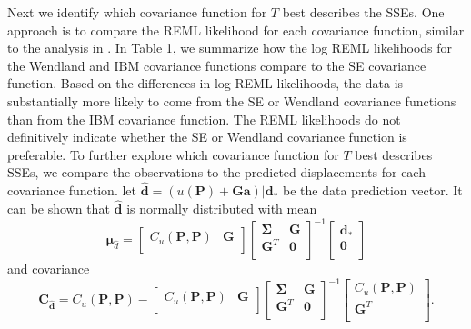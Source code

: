 \documentclass[10pt,letter]{article}
\begin{document}
Next we identify which covariance function for $T$ best describes the SSEs. One approach is to compare the REML likelihood for each covariance function, similar to the analysis in \citet{Langbein2004}. In Table 1, we summarize how the log REML likelihoods for the Wendland and IBM covariance functions compare to the SE covariance function.  Based on the differences in log REML likelihoods, the data is substantially more likely to come from the SE or Wendland covariance functions than from the IBM covariance function. The REML likelihoods do not definitively indicate whether the SE or Wendland covariance function is preferable. To further explore which covariance function for $T$ best describes SSEs, we compare the observations to the predicted displacements for each covariance function. let $\hat{\bm{d}} = \left(u(\bm{P}) + \bm{G}\bm{a}\right)|\bm{d}_*$ be the data prediction vector. It can be shown that $\hat{\bm{d}}$ is normally distributed with mean 
\begin{equation}\label{eq:DataPredMean}
\bm{\mu}_{\hat{d}} = \left[\begin{array}{cc}
                           C_u(\bm{P},\bm{P}) & \bm{G} \\
                           \end{array}\right]
                     \left[\begin{array}{cc}
                           \bm{\Sigma} & \bm{G} \\
                           \bm{G}^T  & \bm{0} \\
                           \end{array}\right]^{-1}
                     \left[\begin{array}{c}
                           \bm{d}_* \\
                           \bm{0} \\
                           \end{array}\right]
\end{equation}  
and covariance
\begin{equation}\label{eq:DataPredCov}
\bm{C}_{\hat{\bm{d}}} = C_u(\bm{P},\bm{P}) - 
                        \left[\begin{array}{cc}
                              C_u(\bm{P},\bm{P}) & \bm{G} \\
                              \end{array}\right]
                        \left[\begin{array}{cc}
                              \bm{\Sigma} & \bm{G} \\
                              \bm{G}^T  & \bm{0} \\
                              \end{array}\right]^{-1}
                        \left[\begin{array}{c}
                              C_u(\bm{P},\bm{P}) \\
                              \bm{G}^T \\
                              \end{array}\right].
\end{equation}
\end{document}
